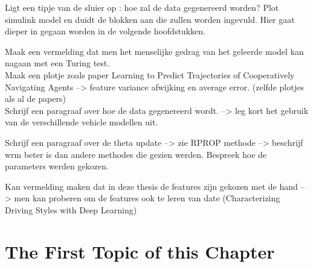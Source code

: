 Ligt een tipje van de sluier op : hoe zal de data gegenereerd worden? 
Plot simulink model en duidt de blokken aan die zullen worden ingevuld. Hier gaat dieper in gegaan worden in de volgende hoofdstukken. 

Maak een vermelding dat men het menselijke gedrag van het geleerde model kan nagaan met een Turing test.\\

Maak een plotje zoals paper Learning to Predict Trajectories of Cooperatively Navigating Agents --> feature variance afwijking en average error. (zelfde plotjes als al de papers)\\

Schrijf een paragraaf over hoe de data gegenereerd wordt. --> leg kort het gebruik van de verschillende vehicle modellen uit. 



Schrijf een paragraaf over de theta update --> zie RPROP methode --> beschrijf wrm beter is dan andere methodes die gezien werden. Bespreek hoe de parameters werden gekozen. 


Kan vermelding maken dat in deze thesis de features zijn gekozen met de hand --> men kan proberen om de features ook te leren van date (Characterizing Driving Styles with Deep Learning)

\clearpage




\section{The First Topic of this Chapter}


